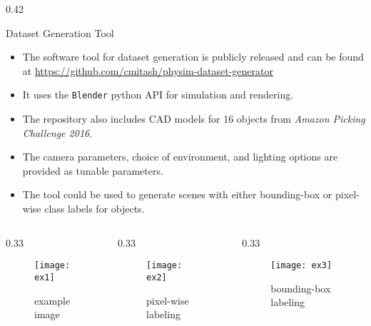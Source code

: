 \begin{columns}[t]
	\begin{column} {0.42\textwidth}
		\begin{block}{\large Dataset Generation Tool}
			\centering
			\begin{itemize}
				\item The software tool for dataset generation is publicly released and can be found at \url{https://github.com/cmitash/physim-dataset-generator}
				\item It uses the {\tt Blender} python API for simulation and rendering.
				\item The repository also includes CAD models for 16 objects from {\it Amazon Picking Challenge 2016}.
				\item The camera parameters, choice of environment, and lighting options are provided as tunable parameters.
				\item The tool could be used to generate scenes with either bounding-box or pixel-wise class labels for objects.
			\end{itemize}
			\begin{columns}[t]
			\begin{column} {0.33\textwidth}
			\begin{figure}[h]
				\texttt{[image: ex1]}
				\caption{example image}
			\end{figure}
			\end{column}
			\begin{column} {0.33\textwidth}
			\begin{figure}[h]
				\texttt{[image: ex2]}
				\caption{pixel-wise labeling}
			\end{figure}
			\end{column}
			\begin{column} {0.33\textwidth}
			\begin{figure}[h]
				\texttt{[image: ex3]}
				\caption{bounding-box labeling}
			\end{figure}
			\end{column}
			\end{columns}
		\end{block}
	\end{column}


\end{columns}

